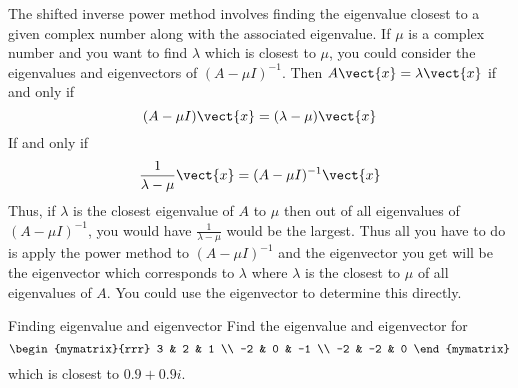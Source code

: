 The shifted inverse power method involves finding the eigenvalue closest to
a given complex number along with the associated eigenvalue. If $\mu $ is a
complex number and you want to find $\lambda $ which is closest to $\mu$,
you could consider the eigenvalues and eigenvectors of $(A-\mu
I) ^{-1}$. Then $A\vect{x}=\lambda \vect{x}$ if and only if 
\begin{equation*}
(A-\mu I) \vect{x}=(\lambda -\mu) \vect{x}
\end{equation*}
If and only if 
\begin{equation*}
\frac{1}{\lambda -\mu }\vect{x}=(A-\mu I) ^{-1}\vect{x}
\end{equation*}
Thus, if $\lambda $ is the closest eigenvalue of $A$ to $\mu $ then out of
all eigenvalues of $(A-\mu I) ^{-1}$, you would have $\frac{1}{
\lambda -\mu }$ would be the largest. Thus all you have to do is apply the
power method to $(A-\mu I) ^{-1}$ and the eigenvector you get
will be the eigenvector which corresponds to $\lambda $ where $\lambda $ is
the closest to $\mu $ of all eigenvalues of $A$. You could use the
eigenvector to determine this directly.

\begin{example}{Finding eigenvalue and eigenvector}{}
Find the eigenvalue and eigenvector for 
\begin{equation*}
\begin{mymatrix}{rrr}
3 & 2 & 1 \\ 
-2 & 0 & -1 \\ 
-2 & -2 & 0
\end{mymatrix}
\end{equation*}
which is closest to $0.9+0.9i$.
\end{example}

